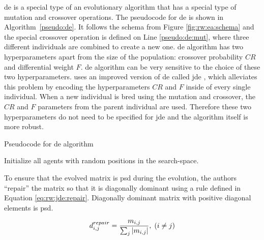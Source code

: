 \documentclass[12pt,a4paper]{report}
\begin{document}
\Ac{de} is a special type of an evolutionary algorithm that has a special type of mutation and crossover operations. The pseudocode for \ac{de} is shown in Algorithm~\ref{pseudo:de}. It follows the schema from Figure \ref{fig:rw:ea:schema} and the special crossover operation is defined on Line \ref{pseudo:de:mut}, where three different individuals are combined to create a new one. \ac{de} algorithm has two hyperparameters apart from the size of the population: crossover probability $CR$ and differential weight $F$. \ac{de} algorithm can be very sensitive to the choice of these two hyperparameters. \citep{fukui2013evolutionary} uses an improved version of \ac{de} called \acf{jde} \citep{brest2006self}, which alleviates this problem by encoding the hyperparameters $CR$ and $F$ inside of every single individual. When a new individual is bred using the mutation and crossover, the $CR$ and $F$ parameters from the parent individual are used. Therefore these two hyperparameters do not need to be specified for \ac{jde} and the algorithm itself is more robust.


\begin{algorithm}[t]
\caption{Pseudocode for \ac{de} algorithm} \label{pseudo:de}
\DontPrintSemicolon
\LinesNumbered
{}
Initialize all agents with random positions in the search-space.\;
\end{algorithm} 

To ensure that the evolved matrix is \ac{psd} during the evolution, the authors ``repair'' the matrix so that it is diagonally dominant using a rule defined in Equation \ref{eq:rw:jde:repair}. Diagonally dominant matrix with positive diagonal elements is \ac{psd}.

\begin{equation}
d_{i,j}^{repair} = \frac{m_{i,j}}{\sum_j \left|{m_{i,j}}\right|}, \; (i \neq j)
\label{eq:rw:jde:repair}
\end{equation}
\end{document}
